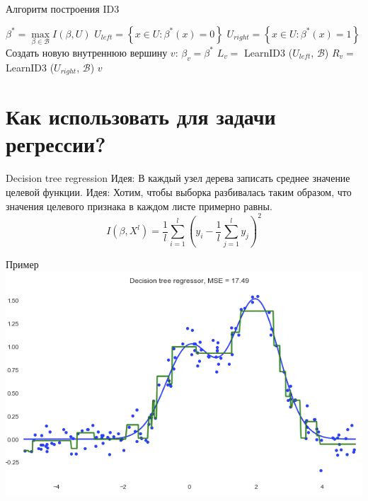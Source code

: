 \documentclass[10pt]{beamer}
\begin{document}
{
\begin{frame}{Алгоритм построения ID3}
  \begin{algorithmic}[1]
         \State {}
       \EndIf
       \State $\beta^* = \max\limits_{\beta \in \mathscr{B}} I(\beta, U)$
       \State $U_{left} = \left\{ x \in U : \beta^*(x) = 0\right\}$	
       \State $U_{right} = \left\{ x \in U : \beta^*(x) = 1\right\}$	
         \State {}
       \EndIf
       \State Создать новую внутреннюю вершину $v$: $\beta_v = \beta^*$
       \State $L_v =$ LearnID3 ($U_{left}$, $\mathscr{B}$)
       \State $R_v =$ LearnID3 ($U_{right}$, $\mathscr{B}$)
       \State \Return $v$
    \EndFunction
  \end{algorithmic}    
\end{frame}
}

\section{Как использовать для задачи регрессии?}

\begin{frame}{Decision tree regression}
  \alert{Идея}: В каждый узел дерева записать среднее значение целевой функции. 
  \pause
  \bigbreak
  \alert{Идея}: Хотим, чтобы выборка разбивалась таким образом, что значения целевого признака в каждом листе примерно равны.
  \pause
  \bigbreak
  $$I(\beta,X^l)= \frac{1}{l} \sum\limits_{i=1}^l ( y_i - \frac{1}{l} \sum\limits_{j=1}^l y_j)^2$$
\end{frame}

\begin{frame}{Пример}
  \centering
  \includegraphics[width=0.9 \textwidth, keepaspectratio]{images/decision_tree}
\end{frame}
\end{document}
